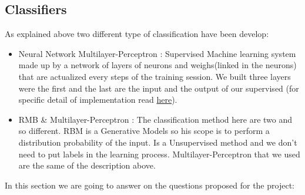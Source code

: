 \documentclass[paper=letter, fontsize=12pt]{article}
\begin{document}
\subsection{Classifiers} 
\label{sec:Classifiers}
As explained above two different type of classification have been develop:
\begin{itemize}
\item Neural Network Multilayer-Perceptron : Supervised Machine learning system made up by a network of layers of neurons and weighs(linked in the neurons) that are actualized every steps of the training session. We built three layers were the first and the last are the input and the output of our supervised (for specific detail of implementation read \hyperref[sec:classimple]{here}).
\item RMB \& Multilayer-Perceptron : The classification method here are two and so different.
RBM is a Generative Models so his scope is to perform a distribution probability of the input.
Is a Unsupervised method and we don't need to put labels in the learning process.
Multilayer-Perceptron that we used are the same of the description above.
\end{itemize}
In this section we are going to answer on the questions proposed for the project:
\end{document}

